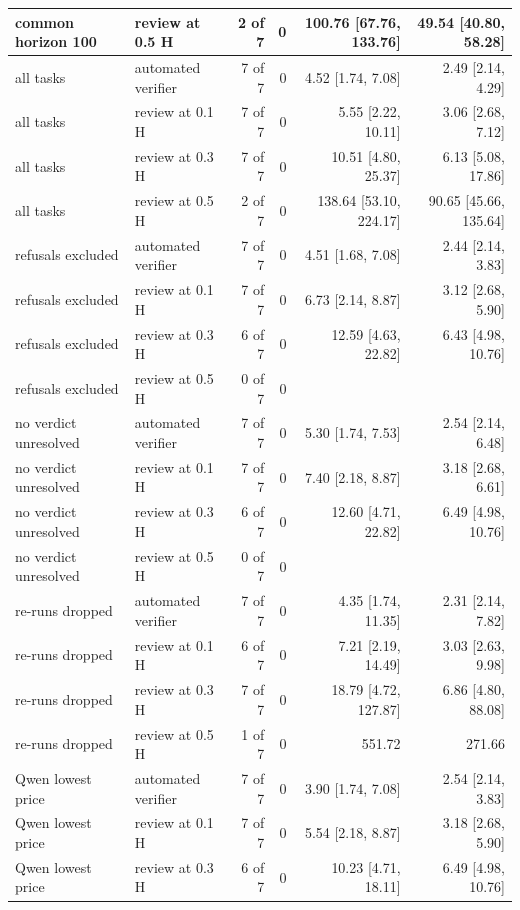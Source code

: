 \begin{table}[t]
\begin{tabular}{llrrrr}
common horizon 100 & review at 0.5 H & 2 of 7 & 0 & 100.76 [67.76, 133.76] & 49.54 [40.80, 58.28] \\
\midrule
all tasks & automated verifier & 7 of 7 & 0 & 4.52 [1.74, 7.08] & 2.49 [2.14, 4.29] \\
all tasks & review at 0.1 H & 7 of 7 & 0 & 5.55 [2.22, 10.11] & 3.06 [2.68, 7.12] \\
all tasks & review at 0.3 H & 7 of 7 & 0 & 10.51 [4.80, 25.37] & 6.13 [5.08, 17.86] \\
all tasks & review at 0.5 H & 2 of 7 & 0 & 138.64 [53.10, 224.17] & 90.65 [45.66, 135.64] \\
\midrule
refusals excluded & automated verifier & 7 of 7 & 0 & 4.51 [1.68, 7.08] & 2.44 [2.14, 3.83] \\
refusals excluded & review at 0.1 H & 7 of 7 & 0 & 6.73 [2.14, 8.87] & 3.12 [2.68, 5.90] \\
refusals excluded & review at 0.3 H & 6 of 7 & 0 & 12.59 [4.63, 22.82] & 6.43 [4.98, 10.76] \\
refusals excluded & review at 0.5 H & 0 of 7 & 0 &  &  \\
\midrule
no verdict unresolved & automated verifier & 7 of 7 & 0 & 5.30 [1.74, 7.53] & 2.54 [2.14, 6.48] \\
no verdict unresolved & review at 0.1 H & 7 of 7 & 0 & 7.40 [2.18, 8.87] & 3.18 [2.68, 6.61] \\
no verdict unresolved & review at 0.3 H & 6 of 7 & 0 & 12.60 [4.71, 22.82] & 6.49 [4.98, 10.76] \\
no verdict unresolved & review at 0.5 H & 0 of 7 & 0 &  &  \\
\midrule
re-runs dropped & automated verifier & 7 of 7 & 0 & 4.35 [1.74, 11.35] & 2.31 [2.14, 7.82] \\
re-runs dropped & review at 0.1 H & 6 of 7 & 0 & 7.21 [2.19, 14.49] & 3.03 [2.63, 9.98] \\
re-runs dropped & review at 0.3 H & 7 of 7 & 0 & 18.79 [4.72, 127.87] & 6.86 [4.80, 88.08] \\
re-runs dropped & review at 0.5 H & 1 of 7 & 0 & 551.72 & 271.66 \\
\midrule
Qwen lowest price & automated verifier & 7 of 7 & 0 & 3.90 [1.74, 7.08] & 2.54 [2.14, 3.83] \\
Qwen lowest price & review at 0.1 H & 7 of 7 & 0 & 5.54 [2.18, 8.87] & 3.18 [2.68, 5.90] \\
Qwen lowest price & review at 0.3 H & 6 of 7 & 0 & 10.23 [4.71, 18.11] & 6.49 [4.98, 10.76] \\

\end{tabular}
\end{table}
